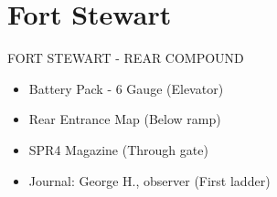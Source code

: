 \chapter{Fort Stewart}
\begin{subregion}{FORT STEWART - REAR COMPOUND}
    \begin{itemize}
        \item Battery Pack - 6 Gauge (Elevator)
        \item Rear Entrance Map (Below ramp)
        \item SPR4 Magazine (Through gate)
        \item Journal: George H., observer (First ladder)
    \end{itemize}
\end{subregion}
